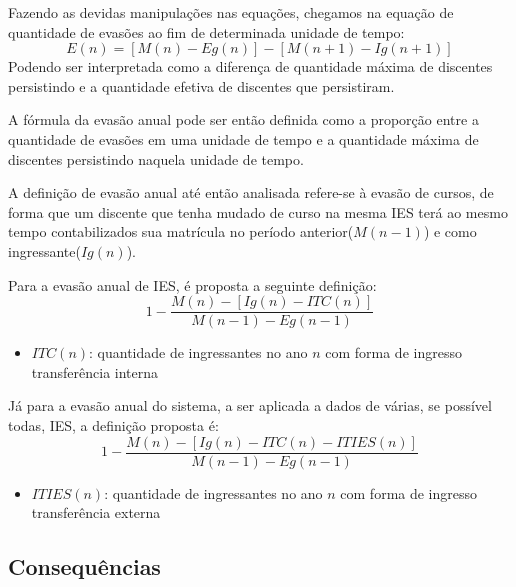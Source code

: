 \documentclass{report}
\begin{document}
Fazendo as devidas manipulações nas equações, chegamos na equação de quantidade de evasões ao fim de determinada unidade de tempo:
\begin{equation}
E(n) = [M(n) - Eg(n)] - [M(n+1) - Ig(n+1)]
\end{equation}
Podendo ser interpretada como a diferença de quantidade máxima de discentes persistindo e a quantidade efetiva de discentes que persistiram.

A fórmula da evasão anual pode ser então definida como a proporção entre a quantidade de evasões em uma unidade de tempo e a quantidade máxima de discentes persistindo naquela unidade de tempo.

A definição de evasão anual até então analisada refere-se à evasão de cursos, de forma que um discente que tenha mudado de curso na mesma IES terá ao mesmo tempo contabilizados sua matrícula no período anterior($M(n-1)$) e como ingressante($Ig(n)$).

Para a evasão anual de IES, é proposta a seguinte definição:
\begin{equation}
1 - \frac{M(n) - [Ig(n) - ITC(n)]}{M(n-1) - Eg(n-1)}
\end{equation}
\begin{itemize}
\item $ITC(n)$: quantidade de ingressantes no ano $n$ com forma de ingresso transferência interna
\end{itemize}

Já para a evasão anual do sistema, a ser aplicada a dados de várias, se possível todas, IES, a definição proposta é:
\begin{equation}
1 - \frac{M(n) - [Ig(n) - ITC(n) - ITIES(n)]}{M(n-1) - Eg(n-1)}
\end{equation}
\begin{itemize}
\item $ITIES(n)$: quantidade de ingressantes no ano $n$ com forma de ingresso transferência externa
\end{itemize}


\subsection{Consequências}
\end{document}
